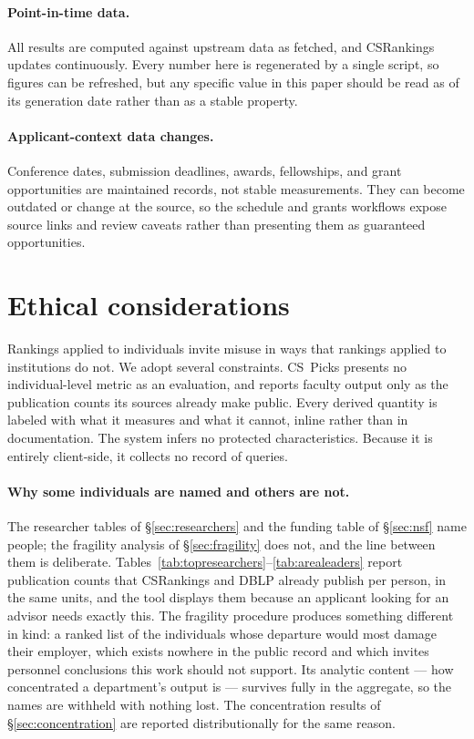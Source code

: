 \documentclass[11pt]{article}
\newcommand{\sys}{CS~Picks}
\newcommand{\csr}{CSRankings}
\begin{document}
\paragraph{Point-in-time data.} All results are computed against upstream data
as fetched, and \csr{} updates continuously. Every number here is regenerated
by a single script, so figures can be refreshed, but any specific value in this
paper should be read as of its generation date rather than as a stable
property.

\paragraph{Applicant-context data changes.} Conference dates, submission
deadlines, awards, fellowships, and grant opportunities are maintained records,
not stable measurements. They can become outdated or change at the source, so
the schedule and grants workflows expose source links and review caveats rather
than presenting them as guaranteed opportunities.

\section{Ethical considerations}
\label{sec:ethics}

Rankings applied to individuals invite misuse in ways that rankings applied to
institutions do not. We adopt several constraints. \sys{} presents no
individual-level metric as an evaluation, and reports faculty output only as the
publication counts its sources already make public. Every derived quantity is
labeled with what it measures and what it cannot, inline rather than in
documentation. The system infers no protected characteristics. Because it is
entirely client-side, it collects no record of queries.

\paragraph{Why some individuals are named and others are not.} The researcher
tables of \S\ref{sec:researchers} and the funding table of \S\ref{sec:nsf} name
people; the fragility analysis of \S\ref{sec:fragility} does not, and the line
between them is deliberate. Tables~\ref{tab:topresearchers}--\ref{tab:arealeaders}
report publication counts that \csr{} and DBLP already publish per person, in
the same units, and the tool displays them because an applicant looking for an
advisor needs exactly this. The fragility procedure produces something
different in kind: a ranked list of the individuals whose departure would most
damage their employer, which exists nowhere in the public record and which
invites personnel conclusions this work should not support. Its analytic content
--- how concentrated a department's output is --- survives fully in the
aggregate, so the names are withheld with nothing lost. The concentration
results of \S\ref{sec:concentration} are reported distributionally for the same
reason.
\end{document}
